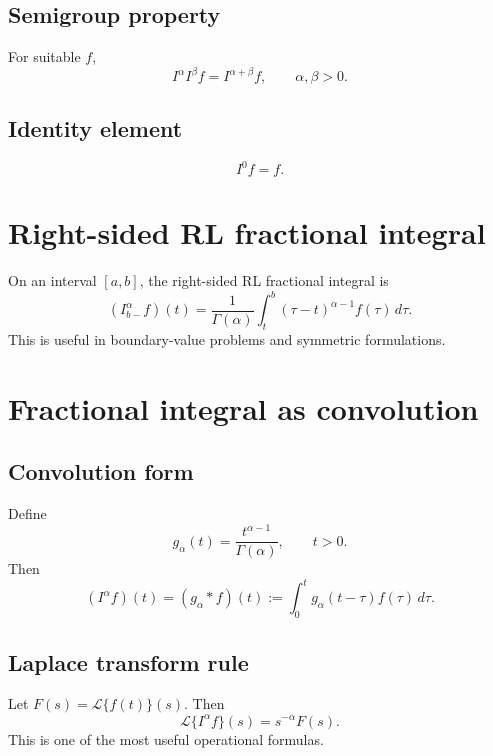\subsection{Semigroup property}
For suitable $f$,
\begin{equation}
\boxed{
I^\alpha I^\beta f = I^{\alpha+\beta}f,
\qquad \alpha,\beta>0.
}
\end{equation}

\subsection{Identity element}
\begin{equation}
I^0 f = f.
\end{equation}


\section{Right-sided RL fractional integral}

On an interval $[a,b]$, the right-sided RL fractional integral is
\begin{equation}
\boxed{
(I_{b-}^\alpha f)(t)
=
\frac{1}{\Gamma(\alpha)}
\int_t^b (\tau-t)^{\alpha-1}f(\tau)\,d\tau.
}
\end{equation}
This is useful in boundary-value problems and symmetric formulations.


\section{Fractional integral as convolution}

\subsection{Convolution form}
Define
\[
g_\alpha(t)=\frac{t^{\alpha-1}}{\Gamma(\alpha)},\qquad t>0.
\]
Then
\begin{equation}
(I^\alpha f)(t) = (g_\alpha * f)(t)
:= \int_0^t g_\alpha(t-\tau)f(\tau)\,d\tau.
\end{equation}

\subsection{Laplace transform rule}
Let $F(s)=\mathcal{L}\{f(t)\}(s)$. Then
\begin{equation}
\boxed{
\mathcal{L}\{I^\alpha f\}(s) = s^{-\alpha}F(s).
}
\end{equation}
This is one of the most useful operational formulas.


